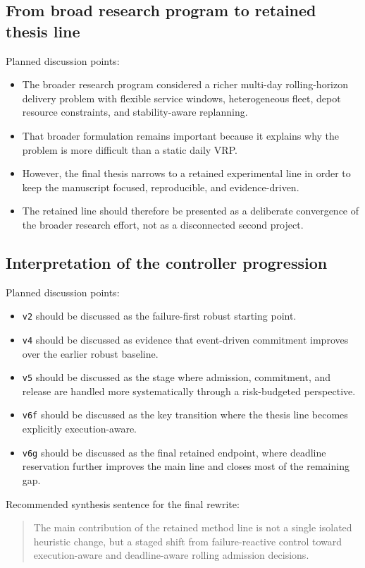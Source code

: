 \subsection{From broad research program to retained thesis line}

Planned discussion points:
\begin{itemize}
    \item The broader research program considered a richer multi-day rolling-horizon delivery problem with flexible service windows, heterogeneous fleet, depot resource constraints, and stability-aware replanning.
    \item That broader formulation remains important because it explains why the problem is more difficult than a static daily VRP.
    \item However, the final thesis narrows to a retained experimental line in order to keep the manuscript focused, reproducible, and evidence-driven.
    \item The retained line should therefore be presented as a deliberate convergence of the broader research effort, not as a disconnected second project.
\end{itemize}

\subsection{Interpretation of the controller progression}

Planned discussion points:
\begin{itemize}
    \item \texttt{v2} should be discussed as the failure-first robust starting point.
    \item \texttt{v4} should be discussed as evidence that event-driven commitment improves over the earlier robust baseline.
    \item \texttt{v5} should be discussed as the stage where admission, commitment, and release are handled more systematically through a risk-budgeted perspective.
    \item \texttt{v6f} should be discussed as the key transition where the thesis line becomes explicitly execution-aware.
    \item \texttt{v6g} should be discussed as the final retained endpoint, where deadline reservation further improves the main line and closes most of the remaining gap.
\end{itemize}

Recommended synthesis sentence for the final rewrite:
\begin{quote}
The main contribution of the retained method line is not a single isolated heuristic change, but a staged shift from failure-reactive control toward execution-aware and deadline-aware rolling admission decisions.
\end{quote}

